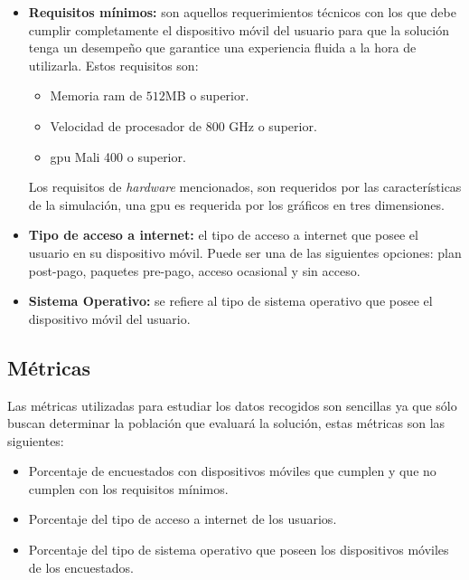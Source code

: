 \begin{itemize}

\item \textbf{Requisitos mínimos:} son aquellos requerimientos técnicos con los que 
    debe cumplir completamente el dispositivo móvil del usuario para que la 
    solución tenga un desempeño que garantice una experiencia fluida a la hora de 
    utilizarla. Estos requisitos son:
    \begin{itemize}
        \item Memoria ram de $512$MB o superior.
        \item Velocidad de procesador de $800$ GHz o superior.
        \item \Gls{gpu} Mali 400 o superior.
    \end{itemize}
    Los requisitos de \textit{hardware} mencionados, son requeridos por las
    características de la simulación, una \Gls{gpu} es requerida por los gráficos en 
    tres dimensiones.

\item \textbf{Tipo de acceso a internet:} el tipo de acceso a internet que posee el 
    usuario en su dispositivo móvil. Puede ser una de las siguientes opciones:
    plan post-pago, paquetes pre-pago, acceso ocasional y sin acceso.
    
\item \textbf{Sistema Operativo:} se refiere al tipo de sistema operativo que posee 
    el dispositivo móvil del usuario.

    
\end{itemize}

\subsection{Métricas}

Las métricas utilizadas para estudiar los datos recogidos son sencillas ya que
sólo buscan determinar la población que evaluará la solución, estas métricas son
las siguientes:

\begin{itemize}
\item Porcentaje de encuestados con dispositivos móviles que cumplen y que no cumplen con 
los requisitos mínimos.
\item Porcentaje del tipo de acceso a internet de los usuarios.
\item Porcentaje del tipo de sistema operativo que poseen los dispositivos móviles de los 
encuestados.
\end{itemize}


